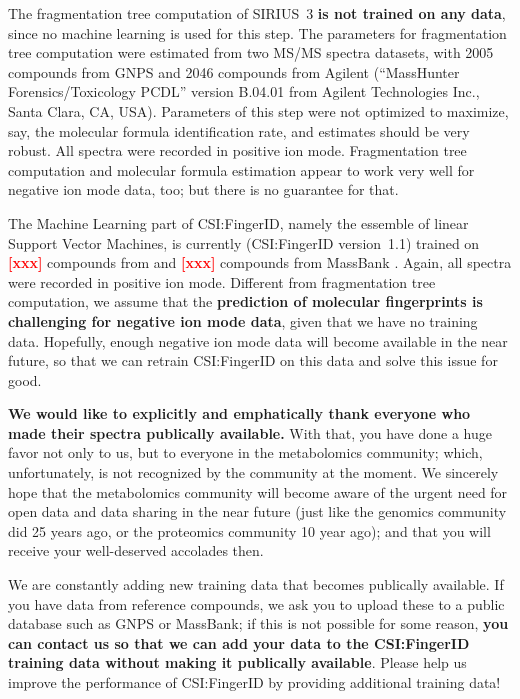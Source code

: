 \documentclass[letterpaper,10pt,openany,oneside]{sphinxmanual}
\newcommand{\todo}[1]{\xspace{\bfseries\sffamily\textcolor{red}{[#1]}}\xspace}
\begin{document}
The fragmentation tree computation of SIRIUS~3 \textbf{is not trained on any
data}, since no machine learning is used for this step.  The parameters for
fragmentation tree computation were estimated from two MS/MS spectra
datasets, with 2005 compounds from GNPS \citep{wang16sharing} and 2046
compounds from Agilent (``MassHunter Forensics/Toxicology PCDL'' version
B.04.01 from Agilent Technologies Inc., Santa Clara, CA, USA).  Parameters of
this step were not optimized to maximize, say, the molecular formula
identification rate, and estimates should be very robust.  All spectra were
recorded in positive ion mode.  Fragmentation tree computation and molecular
formula estimation appear to work very well for negative ion mode data, too;
but there is no guarantee for that.

The Machine Learning part of CSI:FingerID, namely the essemble of linear
Support Vector Machines, is currently (CSI:FingerID version~1.1) trained
on \todo{xxx} compounds from \citep{wang16sharing} and \todo{xxx} compounds
from MassBank \citep{horai10massbank}.  Again, all spectra were recorded in
positive ion mode.  Different from fragmentation tree computation, we assume
that the \textbf{prediction of molecular fingerprints is challenging for
negative ion mode data}, given that we have no training data.  Hopefully,
enough negative ion mode data will become available in the near future, so
that we can retrain CSI:FingerID on this data and solve this issue for good.

\textbf{We would like to explicitly and emphatically thank everyone who made
their spectra publically available.}  With that, you have done a huge favor
not only to us, but to everyone in the metabolomics community; which,
unfortunately, is not recognized by the community at the moment.  We
sincerely hope that the metabolomics community will become aware of the
urgent need for open data and data sharing in the near future (just like the
genomics community did 25 years ago, or the proteomics community 10 year
ago); and that you will receive your well-deserved accolades then.
 
We are constantly adding new training data that becomes publically available.
If you have data from reference compounds, we ask you to upload these to a
public database such as GNPS or MassBank; if this is not possible for some
reason, \textbf{you can contact us so that we can add your data to the
CSI:FingerID training data without making it publically available}.  Please
help us improve the performance of CSI:FingerID by providing additional
training data!
\end{document}
